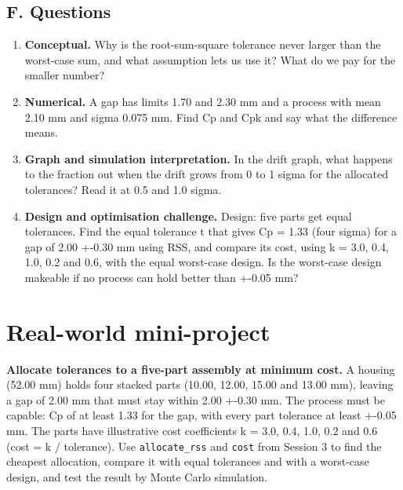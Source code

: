 \documentclass[11pt,a4paper]{article}
\begin{document}
\subsection*{F. Questions}
\begin{enumerate}[nosep]
\item \textbf{Conceptual.} Why is the root-sum-square tolerance never larger than the worst-case sum, and what assumption lets us use it? What do we pay for the smaller number?
\item \textbf{Numerical.} A gap has limits 1.70 and 2.30 mm and a process with mean 2.10 mm and sigma 0.075 mm. Find Cp and Cpk and say what the difference means.
\item \textbf{Graph and simulation interpretation.} In the drift graph, what happens to the fraction out when the drift grows from 0 to 1 sigma for the allocated tolerances? Read it at 0.5 and 1.0 sigma.
\item \textbf{Design and optimisation challenge.} Design: five parts get equal tolerances. Find the equal tolerance t that gives Cp = 1.33 (four sigma) for a gap of 2.00 +-0.30 mm using RSS, and compare its cost, using k = 3.0, 0.4, 1.0, 0.2 and 0.6, with the equal worst-case design. Is the worst-case design makeable if no process can hold better than +-0.05 mm?
\end{enumerate}

\section{Real-world mini-project}
\textbf{Allocate tolerances to a five-part assembly at minimum cost.} A housing (52.00 mm) holds four stacked parts (10.00, 12.00, 15.00 and 13.00 mm), leaving a gap of 2.00 mm that must stay within 2.00 +-0.30 mm. The process must be capable: Cp of at least 1.33 for the gap, with every part tolerance at least +-0.05 mm. The parts have illustrative cost coefficients k = 3.0, 0.4, 1.0, 0.2 and 0.6 (cost = k / tolerance). Use \texttt{allocate\_rss} and \texttt{cost} from Session 3 to find the cheapest allocation, compare it with equal tolerances and with a worst-case design, and test the result by Monte Carlo simulation.
\end{document}
